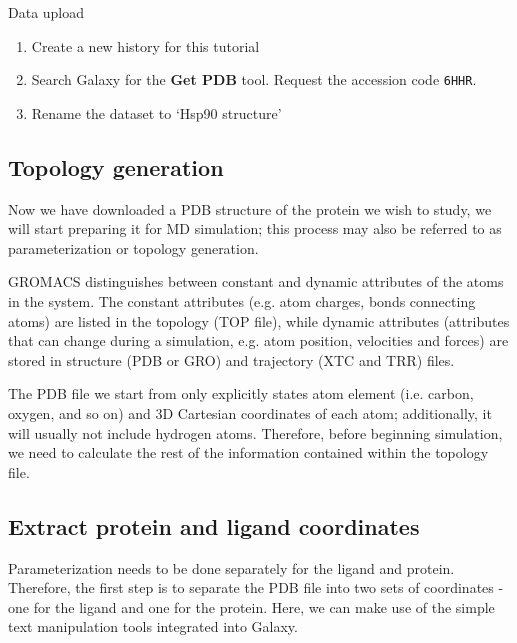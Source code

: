 \documentclass[twocolumn]{bmcart}%
\providecommand{\tightlist}{%
  \setlength{\itemsep}{0pt}\setlength{\parskip}{0pt}}
\begin{document}
\begin{handson_box_colour}{Data upload}

\begin{enumerate}
\def\labelenumi{\arabic{enumi}.}
\tightlist
\item
  Create a new history for this tutorial
\item
  Search Galaxy for the \textbf{Get PDB} tool. Request the accession code \texttt{6HHR}.
\item
  Rename the dataset to `Hsp90 structure'

\end{enumerate}
\end{handson_box_colour}

\subsection*{Topology generation}\label{topology-generation}

Now we have downloaded a PDB structure of the protein we wish to study, we will start preparing it for MD simulation; this process may also be referred to as parameterization or topology generation.

GROMACS distinguishes between constant and dynamic attributes of the
atoms in the system. The constant attributes (e.g. atom charges, bonds
connecting atoms) are listed in the topology (TOP file), while dynamic
attributes (attributes that can change during a simulation, e.g. atom
position, velocities and forces) are stored in structure (PDB or GRO)
and trajectory (XTC and TRR) files.

The PDB file we start from only explicitly states atom element (i.e. carbon, oxygen, and so on) and
3D Cartesian coordinates of each atom; additionally, it will usually not include hydrogen atoms. Therefore, before beginning simulation, we need to calculate
the rest of the information contained within the topology file.


\subsection*{Extract protein and ligand
coordinates}\label{extract-protein-and-ligand-coordinates}

Parameterization needs to be done separately for the ligand and protein.
Therefore, the first step is to separate the PDB file into two sets of
coordinates - one for the ligand and one for the protein. Here, we can make use of the simple text manipulation tools integrated into Galaxy.
\end{document}
